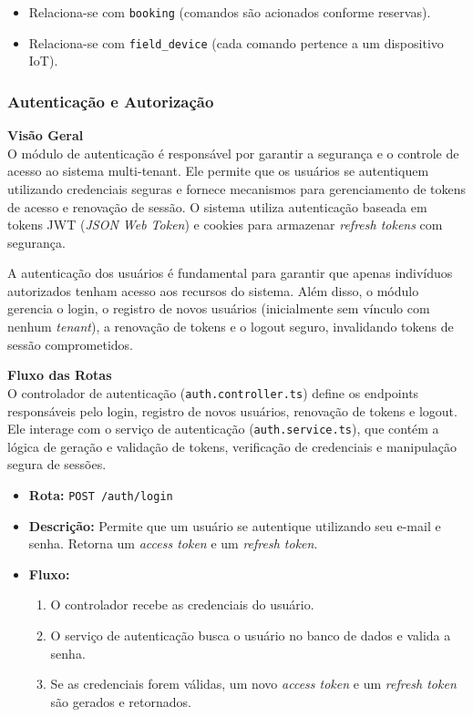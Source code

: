 \begin{itemize} 
	\item Relaciona-se com \texttt{booking} (comandos são acionados conforme reservas). 
	\item Relaciona-se com \texttt{field\_device} (cada comando pertence a um dispositivo IoT). 
\end{itemize}

\subsubsection{Autenticação e Autorização}\label{subsubsec:autenticacao_autorizacao}

\textbf{Visão Geral}\\
O módulo de autenticação é responsável por garantir a segurança e o controle de acesso ao sistema multi-tenant. Ele permite que os usuários se autentiquem utilizando credenciais seguras e fornece mecanismos para gerenciamento de tokens de acesso e renovação de sessão. O sistema utiliza autenticação baseada em tokens JWT (\textit{JSON Web Token}) e cookies para armazenar \textit{refresh tokens} com segurança.

A autenticação dos usuários é fundamental para garantir que apenas indivíduos autorizados tenham acesso aos recursos do sistema. Além disso, o módulo gerencia o login, o registro de novos usuários (inicialmente sem vínculo com nenhum \textit{tenant}), a renovação de tokens e o logout seguro, invalidando tokens de sessão comprometidos.

\textbf{Fluxo das Rotas}\\
O controlador de autenticação (\texttt{auth.controller.ts}) define os endpoints responsáveis pelo login, registro de novos usuários, renovação de tokens e logout. Ele interage com o serviço de autenticação (\texttt{auth.service.ts}), que contém a lógica de geração e validação de tokens, verificação de credenciais e manipulação segura de sessões.

\begin{itemize}
	\item \textbf{Rota:} \texttt{POST /auth/login}
	\item \textbf{Descrição:} Permite que um usuário se autentique utilizando seu e-mail e senha. Retorna um \textit{access token} e um \textit{refresh token}.
	\item \textbf{Fluxo:}
	\begin{enumerate}
		\item O controlador recebe as credenciais do usuário.
		\item O serviço de autenticação busca o usuário no banco de dados e valida a senha.
		\item Se as credenciais forem válidas, um novo \textit{access token} e um \textit{refresh token} são gerados e retornados.
	\end{enumerate}
\end{itemize}

